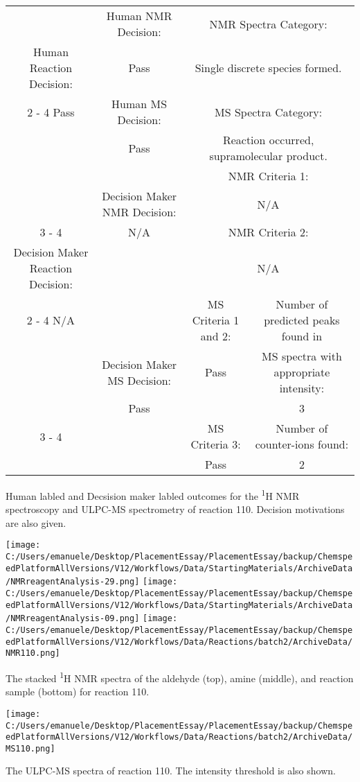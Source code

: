\documentclass{article}%
\begin{document}
\begin{Decision Table}[H]%
\begin{tabular}{|c|c|c|c|}%
\hline%
&Human NMR Decision:&\multicolumn{2}{|c|}{NMR Spectra Category:}\\%
Human Reaction Decision:&Pass&\multicolumn{2}{|c|}{Single discrete species formed.}\\%
\cline{2%
-%
4}%
Pass&Human MS Decision:&\multicolumn{2}{|c|}{MS Spectra Category:}\\%
&Pass&\multicolumn{2}{|c|}{Reaction occurred, supramolecular product.}\\%
\hline%
&&\multicolumn{2}{|c|}{NMR Criteria 1:}\\%
&Decision Maker NMR Decision:&\multicolumn{2}{|c|}{N/A}\\%
\cline{3%
-%
4}%
&N/A&\multicolumn{2}{|c|}{NMR Criteria 2:}\\%
Decision Maker Reaction Decision:&&\multicolumn{2}{|c|}{N/A}\\%
\cline{2%
-%
4}%
N/A&&MS Criteria 1 and 2:&Number of predicted peaks found in\\%
&Decision Maker MS Decision:&Pass&MS spectra with appropriate intensity:\\%
&Pass&&3\\%
\cline{3%
-%
4}%
&&MS Criteria 3:&Number of counter{-}ions found:\\%
&&Pass&2\\%
\hline%
\end{tabular}%
\caption{Human labled and Decsision maker labled outcomes for the \textsuperscript{1}H NMR spectroscopy and ULPC-MS spectrometry of reaction 110. Decision motivations are also given.}%
\end{Decision Table}%
\begin{NMR Spectra}[H]%
\begin{center}%
\texttt{[image: C:/Users/emanuele/Desktop/PlacementEssay/PlacementEssay/backup/ChemspeedPlatformAllVersions/V12/Workflows/Data/StartingMaterials/ArchiveData/NMRreagentAnalysis-29.png]}\hfill%
\texttt{[image: C:/Users/emanuele/Desktop/PlacementEssay/PlacementEssay/backup/ChemspeedPlatformAllVersions/V12/Workflows/Data/StartingMaterials/ArchiveData/NMRreagentAnalysis-09.png]}\hfill%
\texttt{[image: C:/Users/emanuele/Desktop/PlacementEssay/PlacementEssay/backup/ChemspeedPlatformAllVersions/V12/Workflows/Data/Reactions/batch2/ArchiveData/NMR110.png]}\hfill%
\end{center}%
\caption{The stacked \textsuperscript{1}H NMR spectra of the aldehyde (top), amine (middle), and reaction sample (bottom) for reaction 110.}%
\end{NMR Spectra}%
\begin{MS Spectra}[H]%
\begin{center}%
\texttt{[image: C:/Users/emanuele/Desktop/PlacementEssay/PlacementEssay/backup/ChemspeedPlatformAllVersions/V12/Workflows/Data/Reactions/batch2/ArchiveData/MS110.png]}\hfill%
\end{center}%
\caption{The ULPC-MS spectra of reaction 110. The intensity threshold is also shown.}%
\end{MS Spectra}%
\end{document}
